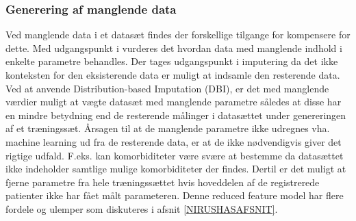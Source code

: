 \subsubsection{Generering af manglende data}
Ved manglende data i et datasæt findes der forskellige tilgange for kompensere for dette. Med udgangspunkt i \cite{Saar2007} vurderes det hvordan data med manglende indhold i enkelte parametre behandles. Der tages udgangspunkt i imputering da det ikke konteksten for den eksisterende data er muligt at indsamle den resterende data. Ved at anvende Distribution-based Imputation (DBI), er det med manglende værdier muligt at vægte datasæt med manglende parametre således at disse har en mindre betydning end de resterende målinger i datasættet under genereringen af et træningssæt. Årsagen til at de manglende parametre ikke udregnes vha. machine learning ud fra de resterende data, er at de ikke nødvendigvis giver det rigtige udfald. F.eks. kan komorbiditeter være svære at bestemme da datasættet ikke indeholder samtlige mulige komorbiditeter der findes. Dertil er det muligt at fjerne parametre fra hele træningssættet hvis hoveddelen af de registrerede patienter ikke har fået målt parameteren. Denne reduced feature model har flere fordele og ulemper som diskuteres i afsnit \ref{NIRUSHASAFSNIT}. 